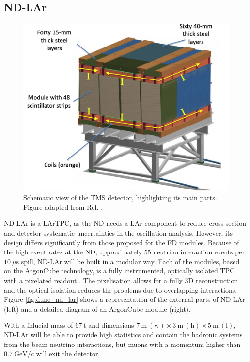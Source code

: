 \subsection{ND-LAr}

\begin{figure}[t]
	\centering
	\includegraphics[width=0.65\linewidth]{Images/DUNE/ND/nd_tms}
	\caption[Schematic view of the TMS detector, highlighting its main parts.]{Schematic view of the TMS detector, highlighting its main parts. Figure adapted from Ref. \cite{Nehm2024}.}
	\label{fig:dune_tms}
\end{figure}

ND-LAr is a LArTPC, as the ND needs a LAr component to reduce cross section and detector systematic uncertainties in the oscillation analysis. However, its design differs significantly from those proposed for the FD modules. Because of the high event rates at the ND, approximately $55$ neutrino interaction events per $10~\mu\mathrm{s}$ spill, ND-LAr will be built in a modular way. Each of the modules, based on the ArgonCube technology, is a fully instrumented, optically isolated TPC with a pixelated readout \cite{Asaadi2019}. The pixelisation allows for a fully 3D reconstruction and the optical isolation reduces the problems due to overlapping interactions. Figure \ref{fig:dune_nd_lar} shows a representation of the external parts of ND-LAr (left) and a detailed diagram of an ArgonCube module (right).

With a fiducial mass of $67~\mathrm{t}$ and dimensions $7~\mathrm{m} \ (\text{w}) \times 3~\mathrm{m} \ (\text{h}) \times 5~\mathrm{m} \ (\text{l})$, ND-LAr will be able to provide high statistics and contain the hadronic systems from the beam neutrino interactions, but muons with a momentum higher than $0.7~\mathrm{GeV}/c$ will exit the detector.

